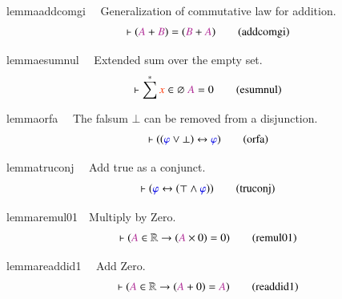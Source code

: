 \begin{restatable}{lemma}{addcomgi}~~ Generalization of commutative law for
addition.    ~
\begin{align}
\vdash ( \mc{A} + \mc{B} ) = ( \mc{B} + \mc{A}
    )\label{eq:addcomgi}\tag{addcomgi}
\end{align}
\end{restatable}

\begin{restatable}{lemma}{esumnul}~~ Extended sum over the empty set. 
~
\begin{align}
\vdash \sum^{\ast} \msc{x} \in \varnothing~ \mc{A} = 0\label{eq:esumnul}\tag{esumnul}
\end{align}
\end{restatable}

\begin{restatable}{lemma}{orfa}~~ The falsum $\bot$ can be removed from a
disjunction.  ~
\begin{align}
\vdash ( ( \mw{\varphi} \vee \bot ) \leftrightarrow \mw{\varphi}
    )\label{eq:orfa}\tag{orfa}
\end{align}
\end{restatable}

\begin{restatable}{lemma}{truconj}~~ Add true as a conjunct.  ~
\begin{align}
\vdash ( \mw{\varphi} \leftrightarrow ( \top \wedge \mw{\varphi} )
    )\label{eq:truconj}\tag{truconj}
\end{align}
\end{restatable}

\begin{restatable}{lemma}{remul01}~~Multiply by Zero.
       ~
\begin{align}
\vdash ( \mc{A} \in \mathbb{R} \rightarrow ( \mc{A} \times 0 ) = 0
    )\label{eq:remul01}\tag{remul01}
\end{align}
\end{restatable}

\begin{restatable}{lemma}{readdid1}~~ Add Zero.  ~
\begin{align}
\vdash ( \mc{A} \in \mathbb{R} \rightarrow ( \mc{A} + 0 ) = \mc{A}
    )\label{eq:readdid1}\tag{readdid1}
\end{align}
\end{restatable}

